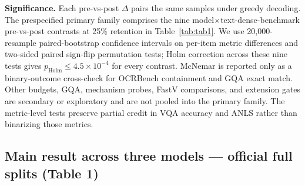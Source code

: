 \documentclass[sigconf,nonacm]{acmart}
\begin{document}
\textbf{Significance.} Each pre-vs-post $\Delta$ pairs the same samples under
greedy decoding. The prespecified primary family comprises the nine
model$\times$text-dense-benchmark pre-vs-post contrasts at 25\% retention in
Table~\ref{tab:tab1}. We use 20,000-resample paired-bootstrap confidence
intervals on per-item metric differences and two-sided paired sign-flip
permutation tests; Holm correction across these nine tests gives
$p_{\mathrm{Holm}}\leq4.5\times10^{-4}$ for every contrast. McNemar is reported
only as a binary-outcome cross-check for OCRBench containment and GQA exact
match. Other budgets, GQA, mechanism probes, FastV comparisons, and extension
gates are secondary or exploratory and are not pooled into the primary family.
The metric-level tests preserve partial credit in VQA accuracy and ANLS rather
than binarizing those metrics.

\subsection{Main result across three models --- official full splits (Table 1)}\label{sec:qwen}
\end{document}
